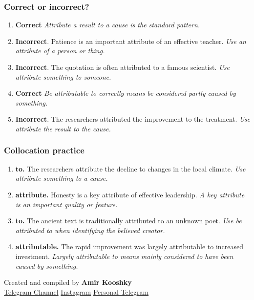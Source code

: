 \documentclass[11pt]{article}
\begin{document}
\subsubsection{Correct or incorrect?}
\begin{enumerate}
  \item \textbf{Correct} \emph{Attribute a result to a cause is the standard pattern.}
  \item \textbf{Incorrect}. Patience is an important attribute of an effective teacher. \emph{Use an attribute of a person or thing.}
  \item \textbf{Incorrect}. The quotation is often attributed to a famous scientist. \emph{Use attribute something to someone.}
  \item \textbf{Correct} \emph{Be attributable to correctly means be considered partly caused by something.}
  \item \textbf{Incorrect}. The researchers attributed the improvement to the treatment. \emph{Use attribute the result to the cause.}
\end{enumerate}

\subsubsection{Collocation practice}
\begin{enumerate}
  \item \textbf{to.} The researchers attribute the decline to changes in the local climate. \emph{Use attribute something to a cause.}
  \item \textbf{attribute.} Honesty is a key attribute of effective leadership. \emph{A key attribute is an important quality or feature.}
  \item \textbf{to.} The ancient text is traditionally attributed to an unknown poet. \emph{Use be attributed to when identifying the believed creator.}
  \item \textbf{attributable.} The rapid improvement was largely attributable to increased investment. \emph{Largely attributable to means mainly considered to have been caused by something.}
\end{enumerate}

\vfill
\begin{center}
\small\color{Muted} Created and compiled by \textbf{Amir Kooshky}\\
\href{https://t.me/KooshkyTOEFL}{Telegram Channel}\quad\textbullet\quad
\href{https://www.instagram.com/kooshkytoefl}{Instagram}\quad\textbullet\quad
\href{https://t.me/KooshkyTOEFL\_pv}{Personal Telegram}
\end{center}
\end{document}
